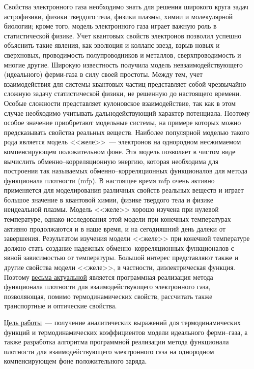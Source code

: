 
\intro

Свойства электронного газа необходимо знать для решения широкого круга задач астрофизики, физики твердого тела, физики плазмы, химии и молекулярной биологии; кроме того, модель электронного газа играет важную роль в статистической физике. Учет квантовых свойств электронов позволил успешно объяснить такие явления, как эволюция и коллапс звезд, взрыв новых и сверхновых, проводимость полупроводников и металлов, сверхпроводимость и многие другие. Широкую известность получила модель невзаимодействующего (идеального) ферми-газа в силу своей простоты. Между тем, учет взаимодействия для системы квантовых частиц представляет собой чрезвычайно сложную задачу статистической физики, не решенную до настоящего времени. Особые сложности представляет кулоновское взаимодействие, так как в этом случае необходимо учитывать дальнодействующий характер потенциала. Поэтому особое значение приобретают модельные системы, на примере которых можно предсказывать свойства реальных веществ. Наиболее популярной моделью такого рода является модель <<желе>>~--- электронов на однородном несжимаемом компенсирующем положительном фоне. Эта модель позволяет в чистом виде вычислить обменно--корреляционную энергию, которая необходима для построения так называемых обменно--корреляционных функционалов для метода функционала плотности (\acrshort{mfp}). В настоящее время \acrshort{mfp} очень активно применяется для моделирования различных свойств реальных веществ и играет большое значение в квантовой химии, физике твердого тела и физике неидеальной плазмы. Модель <<желе>> хорошо изучена при нулевой температуре, однако исследования этой модели при конечных температурах активно продолжаются и в наше время, и на сегодняшний день далеки от завершения. Результатом изучения модели <<желе>> при конечной температуре должно стать создание надежных обменно--корреляционных функционалов с явной зависимостью от температуры. Большой интерес представляют также и другие свойства модели <<желе>>, в частности, диэлектрическая функция. Поэтому \underline{весьма актуальной} является программная реализация метода функционала плотности для взаимодействующего электронного газа, позволяющая, помимо термодинамических свойств, рассчитать также транспортные и оптические свойства.  

\underline{Цель работы}~--- получение аналитических выражений для термодинамических функций и термодинамических коэффициентов модели идеального ферми--газа, а также разработка алгоритма программной реализации метода функционала плотности для взаимодействующего электронного газа на однородном компенсирующем фоне положительного заряда.